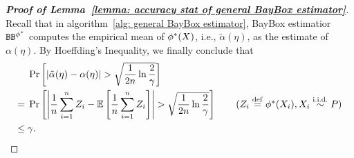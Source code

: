\begin{proof}[\textbf{Proof of Lemma~\ref{lemma: accuracy stat of general BayBox estimator}}]
    Recall that in algorithm~\ref{alg: general BayBox estimator}, BayBox estimatior $\mathtt{BB}^{\phi^*}$ computes the empirical mean of $\phi^*(X)$, i.e., $\tilde{\alpha}(\eta)$, as the estimate of $\alpha(\eta)$. By Hoeffding's Inequality, we finally conclude that
    \begin{align*}
           &\pr{\abs{\tilde{\alpha}(\eta) - \alpha(\eta)} > \sqrt{\frac{1}{2n}\ln{\frac{2}{\gamma}}}} \\
        ={}&\pr{\abs{\frac{1}{n}\rSum{i}{1}{n}\rZ_i - \Ex{\frac{1}{n}\rSum{i}{1}{n}\rZ_i}} > \sqrt{\frac{1}{2n}\ln{\frac{2}{\gamma}}}} \tag{$\rZ_i \defin \phi^*(\rX_i), \rX_i \overset{\text{i.i.d.}}{\sim} P$}\\
        \leq{}& \gamma.
    \end{align*}
\end{proof}

